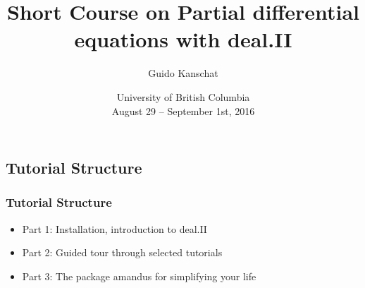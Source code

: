 \documentclass[aspectratio=43]{beamer}
\date[PIMS 2016]{University of British Columbia\\
  August 29 -- September 1st, 2016}
\title[deal.II Course]{Short Course on Partial differential equations with deal.II}
\author[Guido Kanschat]{Guido Kanschat}
\institute[IWR, Uni Heidelberg]{IWR, Universität Heidelberg\\[2mm]
\texttt{[image: iwr]}
\hfill
\texttt{[image: dealclover]}
\hfill
\texttt{[image: unihd]}
}
\begin{document}
\begin{frame}[plain]
  \titlepage    
\end{frame}

\subsection*{Tutorial Structure}
\begin{frame}
  \frametitle{Tutorial Structure}
  \begin{itemize}
  \item Part 1: Installation, introduction to deal.II
  \item Part 2: Guided tour through selected tutorials
  \item Part 3: The package amandus for simplifying your life
  \end{itemize}
\end{frame}




\end{document}
